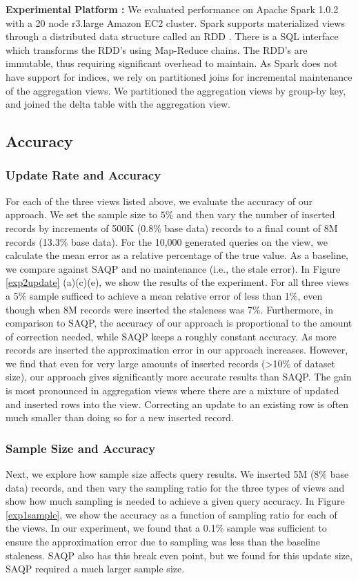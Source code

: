 {\noindent \bf Experimental Platform :}
We evaluated performance on Apache Spark 1.0.2 with a 20 node r3.large Amazon EC2 cluster.
Spark supports materialized views through a distributed data structure called an RDD \cite{zaharia2012resilient}.
There is a SQL interface which transforms the RDD's using Map-Reduce chains.
The RDD's are immutable, thus requiring significant overhead to maintain.
As Spark does not have support for indices, we rely on partitioned joins for incremental maintenance of the aggregation views.
We partitioned the aggregation views by group-by key, and joined the delta table with the aggregation view.

\subsection{Accuracy}
\vspace{-.5em}
\subsubsection{Update Rate and Accuracy}\label{exp:tpcd-acc}
For each of the three views listed above, we evaluate the accuracy of our approach.
We set the sample size to $5\%$ and then vary the number of inserted records by increments of 500K (0.8\% base data) records to a final count of 8M records (13.3\% base data).
For the 10,000 generated queries on the view, we calculate the mean error as a relative percentage of the true value.
As a baseline, we compare against SAQP and no maintenance (i.e., the stale error).
In Figure \ref{exp2update} (a)(c)(e), we show the results of the experiment. 
For all three views a 5\% sample sufficed to achieve a mean relative error of less than 1\%, even though when 8M records were inserted the staleness was 7\%.
Furthermore, in comparison to SAQP, the accuracy of our approach is proportional to the amount of correction needed, while SAQP keeps a roughly constant accuracy.
As more records are inserted the approximation error in our approach increases.
However, we find that even for very large amounts of inserted records (>10\% of dataset size), our approach gives significantly more accurate results
than SAQP.
The gain is most pronounced in aggregation views where there are a mixture of updated and inserted rows into the view.
Correcting an update to an existing row is often much smaller than doing so for a new inserted record.

\subsubsection{Sample Size and Accuracy} Next, we explore how sample size affects query results.
We inserted 5M (8\% base data) records, and then vary the sampling ratio for the three types of views and show how much sampling is needed to achieve a given query accuracy.
In Figure \ref{exp1sample}, we show the accuracy as a function of sampling ratio for each of the views.
In our experiment, we found that a 0.1\% sample was sufficient to ensure the approximation error due to sampling was less than the baseline staleness.
SAQP also has this break even point, but we found for this update size, SAQP required a much larger sample size.

